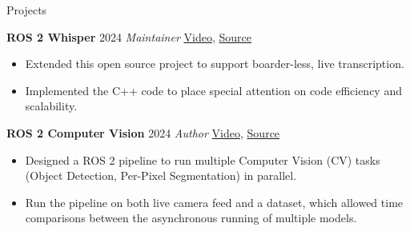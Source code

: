 \begin{rubric}{Projects}

\entry*[] \textbf{ROS 2 Whisper} \hfill 2024 \newline
\emph{Maintainer} \hfill  \href{https://github.com/ros-ai/ros2_whisper/blob/main/doc/harry_potter_sample.gif}{Video}, \href{https://github.com/ros-ai/ros2_whisper}{\faGithub Source} \newline
\vspace{\CVItemizeHeaderSpacing} \begin{itemize}[leftmargin=*, rightmargin=1cm]
	\setlength{\itemsep}{\CVItemizeSpacing}
	\item Extended this open source project to support boarder-less, live transcription.
	\item Implemented the C++ code to place special attention on code efficiency and scalability.
\end{itemize}

\entry*[] \textbf{ROS 2 Computer Vision} \hfill 2024 \newline
\emph{Author} \hfill \href{https://github.com/NathanCorral/ROS-HF-Vision/blob/main/doc/gifs/ex_german_roads.gif}{Video}, \href{https://github.com/NathanCorral/ROS-HF-Vision/tree/main}{\faGithub Source} \newline
\vspace{\CVItemizeHeaderSpacing} \begin{itemize}[leftmargin=*, rightmargin=1cm]
	\setlength{\itemsep}{\CVItemizeSpacing}
	\item Designed a ROS 2 pipeline to run multiple Computer Vision (CV) tasks (Object Detection, Per-Pixel Segmentation) in parallel.  
	\item Run the pipeline on both live camera feed and a dataset, which allowed time comparisons between the asynchronous running of multiple models.
\end{itemize}
\begin{comment}
\entry*[] \textbf{Semantic Search using Facebook AI Similarity (FAISS)} \hfill 2024 \newline \emph{Author} \hfill \href{https://github.com/NathanCorral/Hugging-Face-FAISS-Semantic-Search}{\faGithub Source} \newline
\vspace{\CVItemizeHeaderSpacing} \begin{itemize}[leftmargin=*, rightmargin=1cm]
	\setlength{\itemsep}{\CVItemizeSpacing}
	\item Implemented the first steps in Retrieval-Augmented Generation (ending before "Generation").
	\item Programmed web-scraping, dataset embedding, and similarity comparisons to recover matches in the dataset from a natural language query.
\end{itemize}



\end{comment}
\end{rubric}
